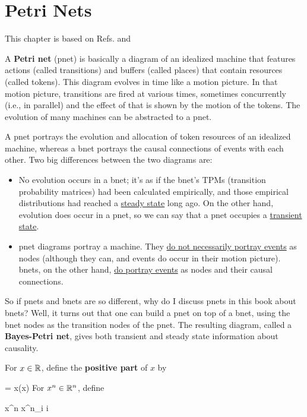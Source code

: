 \chapter{Petri Nets}
\label{ch-petri}

This chapter
is based on Refs.\cite{wiki-pnet} and \cite{tucci-bayes-petri}

A {\bf Petri net} (pnet)
is basically a diagram of an 
idealized machine that 
features actions (called transitions)
and
buffers (called places)
that contain resources (called tokens).
This diagram evolves in time like a motion picture.  In that motion picture, transitions are fired at various times, sometimes concurrently (i.e., in parallel) and the effect of that is shown  by the motion of the tokens. The evolution of many
 machines can be abstracted
to a pnet.

A pnet  portrays the evolution and allocation of token resources of
an idealized machine, whereas 
a bnet 
portrays the causal connections of events with each other. 
Two big differences between the two diagrams  are:

\begin{itemize}
\item No evolution occurs in a bnet; it's as if the
bnet's TPMs (transition probability matrices) had been calculated empirically, and those empirical distributions
had reached a \ul{steady state} long ago.
On the other hand, evolution does occur in a pnet, so
we can say that a pnet  occupies a \ul{ transient state}.
\item pnet diagrams portray a machine. They \ul{do not necessarily portray events} as nodes (although they can, and events do occur in their motion picture). bnets, on the
other hand,  \ul{do portray  events} as nodes and
their causal connections.

\end{itemize}

So if pnets and bnets are so different,
why do I discuss pnets in this book
about bnets? Well,
it turns out that one can build a pnet
on top of a bnet, using the bnet nodes
as the transition nodes of the pnet. The 
resulting diagram,
called  a {\bf Bayes-Petri net},
gives both transient and steady state 
information about causality.

For $x\in { \mathbb{R}}$, define
the {\bf positive part} of $x$ by

\beq
{} = x\indi(x)
\eeq
For $x^n\in{ \mathbb{R}}^n$, define

\beq
x^n \;\;\;\;
x^n_i \;\;\forall i
\eeq

